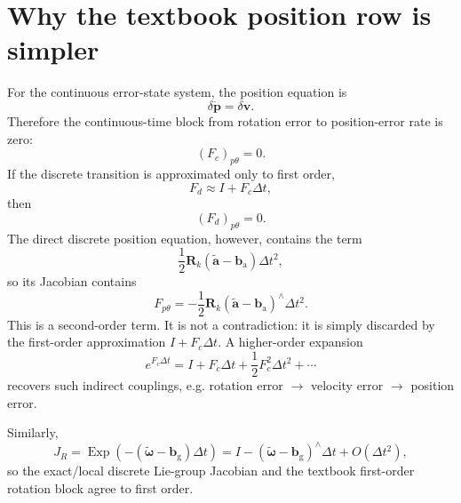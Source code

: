 \documentclass[11pt]{article}
\newcommand{\R}{\mathbf{R}}
\newcommand{\p}{\mathbf{p}}
\newcommand{\vct}{\mathbf{v}}
\newcommand{\bg}{\mathbf{b}_{\mathrm{g}}}
\newcommand{\ba}{\mathbf{b}_{\mathrm{a}}}
\newcommand{\Exp}{\operatorname{Exp}}
\newcommand{\skewop}[1]{#1^{\wedge}}
\newcommand{\atilde}{\tilde{\mathbf{a}}}
\newcommand{\omegatilde}{\tilde{\bm\omega}}
\begin{document}
\section{Why the textbook position row is simpler}
For the continuous error-state system, the position equation is
\begin{equation}
\delta\dot{\p}=\delta\vct.
\end{equation}
Therefore the continuous-time block from rotation error to position-error rate is zero:
\begin{equation}
(F_c)_{p\theta}=0.
\end{equation}
If the discrete transition is approximated only to first order,
\begin{equation}
F_d\approx I+F_c\Delta t,
\end{equation}
then
\begin{equation}
(F_d)_{p\theta}=0.
\end{equation}
The direct discrete position equation, however, contains the term
\begin{equation}
\frac12\R_k(\atilde-\ba)\Delta t^2,
\end{equation}
so its Jacobian contains
\begin{equation}
F_{p\theta}=-\frac12\R_k\skewop{(\atilde-\ba)}\Delta t^2.
\end{equation}
This is a second-order term. It is not a contradiction: it is simply discarded by the first-order approximation $I+F_c\Delta t$. A higher-order expansion
\begin{equation}
e^{F_c\Delta t}
=I+F_c\Delta t+\frac12F_c^2\Delta t^2+\cdots
\end{equation}
recovers such indirect couplings, e.g. rotation error $\rightarrow$ velocity error $\rightarrow$ position error.

Similarly,
\begin{equation}
J_R=\Exp\!\left(-(\omegatilde-\bg)\Delta t\right)
=I-\skewop{(\omegatilde-\bg)}\Delta t+O(\Delta t^2),
\end{equation}
so the exact/local discrete Lie-group Jacobian and the textbook first-order rotation block agree to first order.
\end{document}
